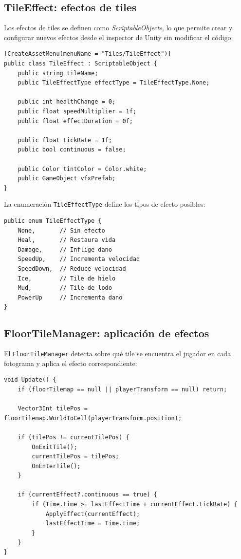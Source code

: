 \subsection{TileEffect: efectos de tiles}


Los efectos de tiles se definen como \textit{ScriptableObjects}, lo que permite crear y configurar nuevos efectos desde el inspector de Unity sin modificar el código:

\begin{lstlisting}
[CreateAssetMenu(menuName = "Tiles/TileEffect")]
public class TileEffect : ScriptableObject {
    public string tileName;
    public TileEffectType effectType = TileEffectType.None;
    
    public int healthChange = 0;
    public float speedMultiplier = 1f;
    public float effectDuration = 0f;
    
    public float tickRate = 1f;
    public bool continuous = false;
    
    public Color tintColor = Color.white;
    public GameObject vfxPrefab;
}
\end{lstlisting}


La enumeración \texttt{TileEffectType} define los tipos de efecto posibles:

\begin{lstlisting}
public enum TileEffectType {
    None,       // Sin efecto
    Heal,       // Restaura vida
    Damage,     // Inflige dano
    SpeedUp,    // Incrementa velocidad
    SpeedDown,  // Reduce velocidad
    Ice,        // Tile de hielo
    Mud,        // Tile de lodo
    PowerUp     // Incrementa dano
}
\end{lstlisting}


\subsection{FloorTileManager: aplicación de efectos}


El \texttt{FloorTileManager} detecta sobre qué tile se encuentra el jugador en cada fotograma y aplica el efecto correspondiente:

\begin{lstlisting}
void Update() {
    if (floorTilemap == null || playerTransform == null) return;
    
    Vector3Int tilePos = floorTilemap.WorldToCell(playerTransform.position);
    
    if (tilePos != currentTilePos) {
        OnExitTile();
        currentTilePos = tilePos;
        OnEnterTile();
    }
    
    if (currentEffect?.continuous == true) {
        if (Time.time >= lastEffectTime + currentEffect.tickRate) {
            ApplyEffect(currentEffect);
            lastEffectTime = Time.time;
        }
    }
}
\end{lstlisting}


